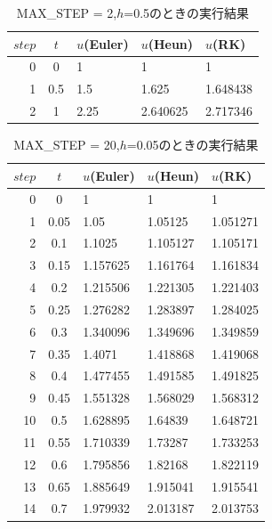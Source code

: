 \documentclass[dvipdfmx]{jarticle}
\begin{document}
        \begin{table}[H]
      \caption{MAX\_STEP = 2,$h$=0.5のときの実行結果}
    \label{h05}
    \begin{center}
        \begin{tabular}{r|c|l|l|l}\hline
          $step$ & $t$ & $u$(Euler) & $u$(Heun) & $u$(RK) \\ \hline \hline
          0 & 0 & 1 & 1 & 1 \\
          1 & 0.5 & 1.5 & 1.625 & 1.648438 \\ 
          2 & 1 & 2.25 & 2.640625 & 2.717346 \\ \hline
        \end{tabular}
    \end{center}
    \end{table}

    \begin{table}[H]
      \caption{MAX\_STEP = 20,$h$=0.05のときの実行結果}
    \label{h005}
    \begin{center}
        \begin{tabular}{r|c|l|l|l}\hline
          $step$ & $t$ & $u$(Euler) & $u$(Heun) & $u$(RK) \\ \hline \hline
          0 & 0 & 1 & 1 & 1 \\
          1 & 0.05 & 1.05 & 1.05125 & 1.051271 \\
          2 & 0.1 & 1.1025 & 1.105127 & 1.105171 \\
          3 & 0.15 & 1.157625 & 1.161764 & 1.161834 \\
          4 & 0.2 & 1.215506 & 1.221305 & 1.221403 \\
          5 & 0.25 & 1.276282 & 1.283897 & 1.284025 \\
          6 & 0.3 & 1.340096 & 1.349696 & 1.349859 \\
          7 & 0.35 & 1.4071 & 1.418868 & 1.419068 \\
          8 & 0.4 & 1.477455 & 1.491585 & 1.491825 \\
          9 & 0.45 & 1.551328 & 1.568029 & 1.568312 \\
          10 & 0.5 & 1.628895 & 1.64839 & 1.648721 \\
          11 & 0.55 & 1.710339 & 1.73287 & 1.733253 \\
          12 & 0.6 & 1.795856 & 1.82168 & 1.822119 \\
          13 & 0.65 & 1.885649 & 1.915041 & 1.915541 \\
          14 & 0.7 & 1.979932 & 2.013187 & 2.013753 \\

\end{tabular}
\end{center}
\end{table}
\end{document}
